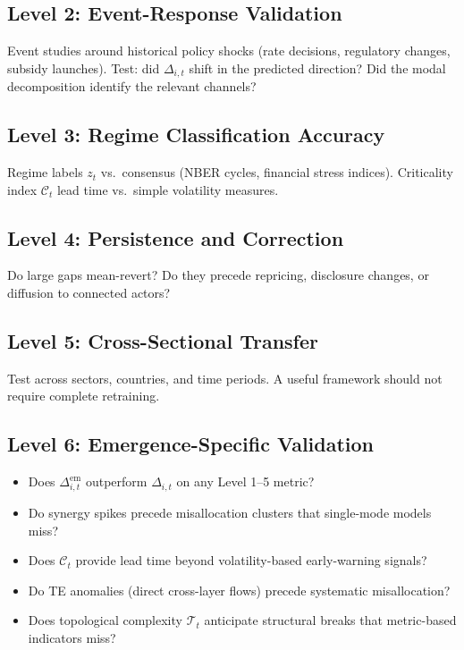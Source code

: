 \documentclass[11pt,a4paper]{article}
\theoremstyle{definition}
\begin{document}
\subsection{Level 2: Event-Response Validation}
Event studies around historical policy shocks (rate decisions, regulatory changes, subsidy launches). Test: did $\Delta_{i,t}$ shift in the predicted direction? Did the modal decomposition identify the relevant channels?

\subsection{Level 3: Regime Classification Accuracy}
Regime labels $z_t$ vs.\ consensus (NBER cycles, financial stress indices). Criticality index $\mathcal{C}_t$ lead time vs.\ simple volatility measures.

\subsection{Level 4: Persistence and Correction}
Do large gaps mean-revert? Do they precede repricing, disclosure changes, or diffusion to connected actors?

\subsection{Level 5: Cross-Sectional Transfer}
Test across sectors, countries, and time periods. A useful framework should not require complete retraining.

\subsection{Level 6: Emergence-Specific Validation}
\begin{itemize}[nosep]
  \item Does $\Delta_{i,t}^{\mathrm{em}}$ outperform $\Delta_{i,t}$ on any Level 1--5 metric?
  \item Do synergy spikes precede misallocation clusters that single-mode models miss?
  \item Does $\mathcal{C}_t$ provide lead time beyond volatility-based early-warning signals?
  \item Do TE anomalies (direct cross-layer flows) precede systematic misallocation?
  \item Does topological complexity $\mathcal{T}_t$ anticipate structural breaks that metric-based indicators miss?
\end{itemize}
\end{document}
